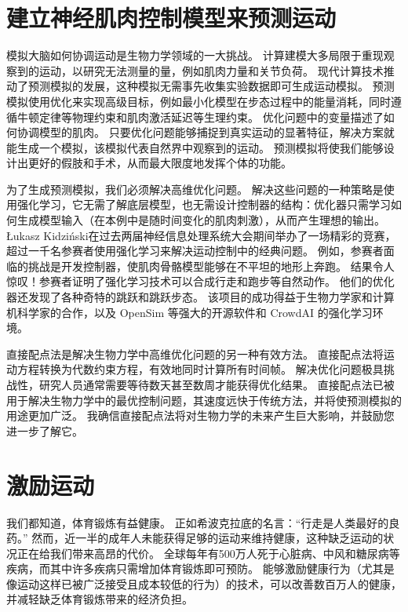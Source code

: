 \section{建立神经肌肉控制模型来预测运动}

模拟大脑如何协调运动是生物力学领域的一大挑战。
计算建模大多局限于重现观察到的运动，以研究无法测量的量，例如肌肉力量和关节负荷。
现代计算技术推动了预测模拟的发展，这种模拟无需事先收集实验数据即可生成运动模拟。
预测模拟使用优化来实现高级目标，例如最小化模型在步态过程中的能量消耗，同时遵循牛顿定律等物理约束和肌肉激活延迟等生理约束。
优化问题中的变量描述了如何协调模型的肌肉。
只要优化问题能够捕捉到真实运动的显著特征，解决方案就能生成一个模拟，该模拟代表自然界中观察到的运动。
预测模拟将使我们能够设计出更好的假肢和手术，从而最大限度地发挥个体的功能。


为了生成预测模拟，我们必须解决高维优化问题。
解决这些问题的一种策略是使用强化学习，它无需了解底层模型，也无需设计控制器的结构：优化器只需学习如何生成模型输入（在本例中是随时间变化的肌肉刺激），从而产生理想的输出。
Łukasz Kidziński\cite{learning2018learning}在过去两届神经信息处理系统大会期间举办了一场精彩的竞赛，超过一千名参赛者使用强化学习来解决运动控制中的经典问题。
例如，参赛者面临的挑战是开发控制器，使肌肉骨骼模型能够在不平坦的地形上奔跑。
结果令人惊叹！参赛者证明了强化学习技术可以合成行走和跑步等自然动作。
他们的优化器还发现了各种奇特的跳跃和跳跃步态。
该项目的成功得益于生物力学家和计算机科学家的合作，以及 OpenSim 等强大的开源软件和 CrowdAI 的强化学习环境。


直接配点法是解决生物力学中高维优化问题的另一种有效方法。
直接配点法将运动方程转换为代数约束方程，有效地同时计算所有时间帧。
解决优化问题极具挑战性，研究人员通常需要等待数天甚至数周才能获得优化结果。
直接配点法已被用于解决生物力学中的最优控制问题，其速度远快于传统方法，并将使预测模拟的用途更加广泛。
我确信直接配点法将对生物力学的未来产生巨大影响，并鼓励您进一步了解它。


\section{激励运动}

我们都知道，体育锻炼有益健康。
正如希波克拉底的名言：“行走是人类最好的良药。” 
然而，近一半的成年人未能获得足够的运动来维持健康，这种缺乏运动的状况正在给我们带来高昂的代价。
全球每年有500万人死于心脏病、中风和糖尿病等疾病，而其中许多疾病只需增加体育锻炼即可预防\cite{lee2017reducing}。
能够激励健康行为（尤其是像运动这样已被广泛接受且成本较低的行为）的技术，可以改善数百万人的健康，并减轻缺乏体育锻炼带来的经济负担。


